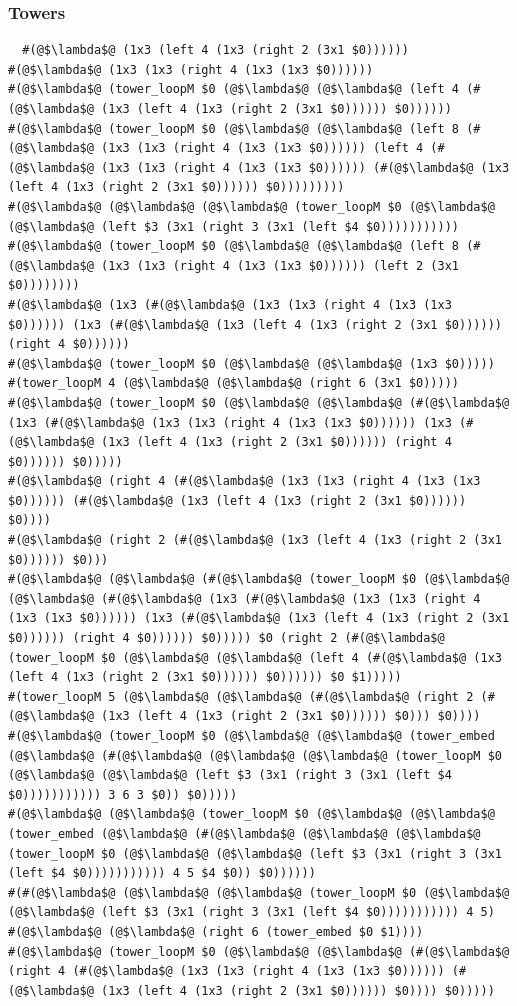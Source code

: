 \documentclass{article}
\begin{document}
\subsubsection{Towers}
\begin{lstlisting}
  #(@$\lambda$@ (1x3 (left 4 (1x3 (right 2 (3x1 $0))))))
#(@$\lambda$@ (1x3 (1x3 (right 4 (1x3 (1x3 $0))))))
#(@$\lambda$@ (tower_loopM $0 (@$\lambda$@ (@$\lambda$@ (left 4 (#(@$\lambda$@ (1x3 (left 4 (1x3 (right 2 (3x1 $0)))))) $0))))))
#(@$\lambda$@ (tower_loopM $0 (@$\lambda$@ (@$\lambda$@ (left 8 (#(@$\lambda$@ (1x3 (1x3 (right 4 (1x3 (1x3 $0)))))) (left 4 (#(@$\lambda$@ (1x3 (1x3 (right 4 (1x3 (1x3 $0)))))) (#(@$\lambda$@ (1x3 (left 4 (1x3 (right 2 (3x1 $0)))))) $0)))))))))
#(@$\lambda$@ (@$\lambda$@ (@$\lambda$@ (tower_loopM $0 (@$\lambda$@ (@$\lambda$@ (left $3 (3x1 (right 3 (3x1 (left $4 $0)))))))))))
#(@$\lambda$@ (tower_loopM $0 (@$\lambda$@ (@$\lambda$@ (left 8 (#(@$\lambda$@ (1x3 (1x3 (right 4 (1x3 (1x3 $0)))))) (left 2 (3x1 $0))))))))
#(@$\lambda$@ (1x3 (#(@$\lambda$@ (1x3 (1x3 (right 4 (1x3 (1x3 $0)))))) (1x3 (#(@$\lambda$@ (1x3 (left 4 (1x3 (right 2 (3x1 $0)))))) (right 4 $0))))))
#(@$\lambda$@ (tower_loopM $0 (@$\lambda$@ (@$\lambda$@ (1x3 $0)))))
#(tower_loopM 4 (@$\lambda$@ (@$\lambda$@ (right 6 (3x1 $0)))))
#(@$\lambda$@ (tower_loopM $0 (@$\lambda$@ (@$\lambda$@ (#(@$\lambda$@ (1x3 (#(@$\lambda$@ (1x3 (1x3 (right 4 (1x3 (1x3 $0)))))) (1x3 (#(@$\lambda$@ (1x3 (left 4 (1x3 (right 2 (3x1 $0)))))) (right 4 $0)))))) $0)))))
#(@$\lambda$@ (right 4 (#(@$\lambda$@ (1x3 (1x3 (right 4 (1x3 (1x3 $0)))))) (#(@$\lambda$@ (1x3 (left 4 (1x3 (right 2 (3x1 $0)))))) $0))))
#(@$\lambda$@ (right 2 (#(@$\lambda$@ (1x3 (left 4 (1x3 (right 2 (3x1 $0)))))) $0)))
#(@$\lambda$@ (@$\lambda$@ (#(@$\lambda$@ (tower_loopM $0 (@$\lambda$@ (@$\lambda$@ (#(@$\lambda$@ (1x3 (#(@$\lambda$@ (1x3 (1x3 (right 4 (1x3 (1x3 $0)))))) (1x3 (#(@$\lambda$@ (1x3 (left 4 (1x3 (right 2 (3x1 $0)))))) (right 4 $0)))))) $0))))) $0 (right 2 (#(@$\lambda$@ (tower_loopM $0 (@$\lambda$@ (@$\lambda$@ (left 4 (#(@$\lambda$@ (1x3 (left 4 (1x3 (right 2 (3x1 $0)))))) $0)))))) $0 $1)))))
#(tower_loopM 5 (@$\lambda$@ (@$\lambda$@ (#(@$\lambda$@ (right 2 (#(@$\lambda$@ (1x3 (left 4 (1x3 (right 2 (3x1 $0)))))) $0))) $0))))
#(@$\lambda$@ (tower_loopM $0 (@$\lambda$@ (@$\lambda$@ (tower_embed (@$\lambda$@ (#(@$\lambda$@ (@$\lambda$@ (@$\lambda$@ (tower_loopM $0 (@$\lambda$@ (@$\lambda$@ (left $3 (3x1 (right 3 (3x1 (left $4 $0))))))))))) 3 6 3 $0)) $0)))))
#(@$\lambda$@ (@$\lambda$@ (tower_loopM $0 (@$\lambda$@ (@$\lambda$@ (tower_embed (@$\lambda$@ (#(@$\lambda$@ (@$\lambda$@ (@$\lambda$@ (tower_loopM $0 (@$\lambda$@ (@$\lambda$@ (left $3 (3x1 (right 3 (3x1 (left $4 $0))))))))))) 4 5 $4 $0)) $0))))))
#(#(@$\lambda$@ (@$\lambda$@ (@$\lambda$@ (tower_loopM $0 (@$\lambda$@ (@$\lambda$@ (left $3 (3x1 (right 3 (3x1 (left $4 $0))))))))))) 4 5)
#(@$\lambda$@ (@$\lambda$@ (right 6 (tower_embed $0 $1))))
#(@$\lambda$@ (tower_loopM $0 (@$\lambda$@ (@$\lambda$@ (#(@$\lambda$@ (right 4 (#(@$\lambda$@ (1x3 (1x3 (right 4 (1x3 (1x3 $0)))))) (#(@$\lambda$@ (1x3 (left 4 (1x3 (right 2 (3x1 $0)))))) $0)))) $0)))))
\end{lstlisting}
\end{document}
